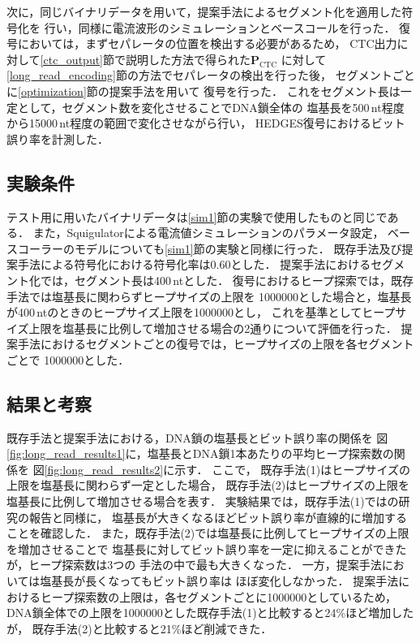 \documentclass[sotsuron]{kuee}
\begin{document}
次に，同じバイナリデータを用いて，提案手法によるセグメント化を適用した符号化を
行い，同様に電流波形のシミュレーションとベースコールを行った．
復号においては，まずセパレータの位置を検出する必要があるため，
CTC出力に対して\ref{ctc_output}節で説明した方法で得られた$\bm{P}_{\mathrm{CTC}}$
に対して\ref{long_read_encoding}節の方法でセパレータの検出を行った後，
セグメントごとに\ref{optimization}節の提案手法を用いて
復号を行った．
これをセグメント長は一定として，セグメント数を変化させることでDNA鎖全体の
塩基長を500\,nt程度から15000\,nt程度の範囲で変化させながら行い，
HEDGES復号におけるビット誤り率を計測した．


\subsection{実験条件}
テスト用に用いたバイナリデータは\ref{sim1}節の実験で使用したものと同じである．
また，Squigulatorによる電流値シミュレーションのパラメータ設定，
ベースコーラーのモデルについても\ref{sim1}節の実験と同様に行った．
既存手法及び提案手法による符号化における符号化率は0.60とした．
提案手法におけるセグメント化では，セグメント長は400\,ntとした．
復号におけるヒープ探索では，既存手法では塩基長に関わらずヒープサイズの上限を
1000000とした場合と，塩基長が400\,ntのときのヒープサイズ上限を1000000とし，
これを基準としてヒープサイズ上限を塩基長に比例して増加させる場合の2通りについて評価を行った．
提案手法におけるセグメントごとの復号では，ヒープサイズの上限を各セグメントごとで
1000000とした．

\subsection{結果と考察}
既存手法と提案手法における，DNA鎖の塩基長とビット誤り率の関係を
図\ref{fig:long_read_results1}に，塩基長とDNA鎖1本あたりの平均ヒープ探索数の関係を
図\ref{fig:long_read_results2}に示す．
ここで，
既存手法(1)はヒープサイズの上限を塩基長に関わらず一定とした場合，
既存手法(2)はヒープサイズの上限を塩基長に比例して増加させる場合を表す．
実験結果では，既存手法(1)では\cite{HEDGES}の研究の報告と同様に，
塩基長が大きくなるほどビット誤り率が直線的に増加することを確認した．
また，既存手法(2)では塩基長に比例してヒープサイズの上限を増加させることで
塩基長に対してビット誤り率を一定に抑えることができたが，ヒープ探索数は3つの
手法の中で最も大きくなった．
一方，提案手法においては塩基長が長くなってもビット誤り率は
ほぼ変化しなかった．
提案手法におけるヒープ探索数の上限は，各セグメントごとに1000000としているため，
DNA鎖全体での上限を1000000とした既存手法(1)と比較すると24\%ほど増加したが，
既存手法(2)と比較すると21\%ほど削減できた．
\end{document}
